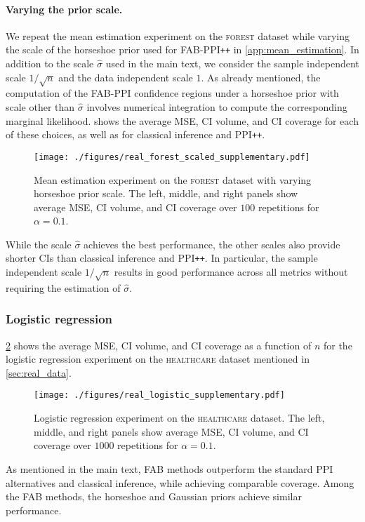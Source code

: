 \paragraph{Varying the prior scale.}
We repeat the mean estimation experiment on the \textsc{forest} dataset while varying the scale of the horseshoe prior used for FAB-PPI\texttt{++} in \cref{app:mean_estimation}. In addition to the scale $\widehat{\sigma}$ used in the main text, we consider the sample independent scale $1 / \sqrt{n}$ and the data independent scale $1$. As already mentioned, the computation of the FAB-PPI confidence regions under a horseshoe prior with scale other than $\widehat{\sigma}$ involves numerical integration to compute the corresponding marginal likelihood.
 shows the average MSE, CI volume, and CI coverage for each of these choices, as well as for classical inference and PPI\texttt{++}.
\begin{figure}[ht!]
    \centering
    \texttt{[image: ./figures/real\_forest\_scaled\_supplementary.pdf]}
    \caption{Mean estimation experiment on the \textsc{forest} dataset with varying horseshoe prior scale. The left, middle, and right panels show average MSE, CI volume, and CI coverage over $100$ repetitions for $\alpha = 0.1$.}
    \label{fig:real_forest_scaled_supplementary}
\end{figure}
While the scale $\widehat{\sigma}$ achieves the best performance, the other scales also provide shorter CIs than classical inference and PPI\texttt{++}. In particular, the sample independent scale $1 / \sqrt{n}$ results in good performance across all metrics without requiring the estimation of $\widehat{\sigma}$.

\subsubsection{Logistic regression}\label{app:logistic}
\cref{fig:real_logistic_supplementary} shows the average MSE, CI volume, and CI coverage as a function of $n$ for the logistic regression experiment on the \textsc{healthcare} dataset mentioned in \cref{sec:real_data}.
\begin{figure}[ht!]
    \centering
    \texttt{[image: ./figures/real\_logistic\_supplementary.pdf]}
    \caption{Logistic regression experiment on the \textsc{healthcare} dataset. The left, middle, and right panels show average MSE, CI volume, and CI coverage over $1000$ repetitions for $\alpha = 0.1$.}
    \label{fig:real_logistic_supplementary}
\end{figure}
As mentioned in the main text, FAB methods outperform the standard PPI alternatives and classical inference, while achieving comparable coverage. Among the FAB methods, the horseshoe and Gaussian priors achieve similar performance.

